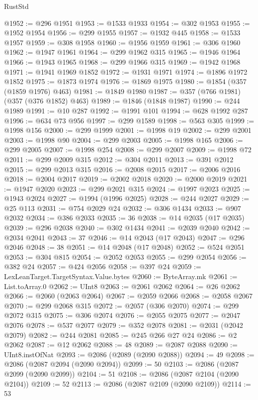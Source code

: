 \begin{lexlean}{RustStd}
\begin{coremodule}
@1952 := @296 @1951
@1953 := @1533 @1933
@1954 := @302 @1953
@1955 := @1952 @1954
@1956 := @299 @1955
@1957 := @1932 @445
@1958 := @1533 @1957
@1959 := @308 @1958
@1960 := @1956 @1959
@1961 := @306 @1960
@1962 := @1947 @1961
@1964 := @299 @1962 @315
@1965 := @1946 @1964
@1966 := @1943 @1965
@1968 := @299 @1966 @315
@1969 := @1942 @1968
@1971 := @1941 @1969 @1852
@1972 := @1931 @1971
@1974 := @1896 @1972 @1852
@1975 := @1873 @1974
@1976 := @1869 @1975
@1980 := @1854 (@357 (@1859 @1976) @463)
@1981 := @1849 @1980
@1987 := @357 (@766 @1981) (@357 (@376 @1852) @463)
@1989 := @1846 (@1848 @1987)
@1990 := @244 @1989
@1991 := @10 @287
@1992 := @1991 @101
@1994 := @628 @1992 @287
@1996 := @634 @73 @956
@1997 := @299 @1589
@1998 := @563 @305
@1999 := @1998 @156
@2000 := @299 @1999
@2001 := @1998 @19
@2002 := @299 @2001
@2003 := @1998 @90
@2004 := @299 @2003
@2005 := @1998 @165
@2006 := @299 @2005
@2007 := @1998 @254
@2008 := @299 @2007
@2009 := @1998 @72
@2011 := @299 @2009 @315
@2012 := @304 @2011
@2013 := @391 @2012
@2015 := @299 @2013 @315
@2016 := @2008 @2015
@2017 := @2006 @2016
@2018 := @2004 @2017
@2019 := @2002 @2018
@2020 := @2000 @2019
@2021 := @1947 @2020
@2023 := @299 @2021 @315
@2024 := @1997 @2023
@2025 := @1943 @2024
@2027 := @1994 (@1996 @2025)
@2028 := @244 @2027
@2029 := @25 @113
@2031 := @754 @2029 @24
@2032 := @306 @1434
@2033 := @907 @2032
@2034 := @386 @2033
@2035 := 36
@2038 := @14 @2035 (@17 @2035)
@2039 := @296 @2038
@2040 := @302 @1434
@2041 := @2039 @2040
@2042 := @2034 @2041
@2043 := 37
@2046 := @14 @2043 (@17 @2043)
@2047 := @296 @2046
@2048 := 38
@2051 := @14 @2048 (@17 @2048)
@2052 := @524 @2051
@2053 := @304 @815
@2054 := @2052 @2053
@2055 := @299 @2054
@2056 := @382 @24
@2057 := @424 @2056
@2058 := @397 @24
@2059 := LexLeanTarget.TargetSyntax.Value.bytes
@2060 := ByteArray.mk
@2061 := List.toArray.{0}
@2062 := UInt8
@2063 := @2061 @2062
@2064 := @26 @2062
@2066 := @2060 (@2063 @2064)
@2067 := @2059 @2066
@2068 := @2058 @2067
@2070 := @299 @2068 @315
@2072 := @2057 (@306 @2070)
@2074 := @299 @2072 @315
@2075 := @306 @2074
@2076 := @2055 @2075
@2077 := @2047 @2076
@2078 := @537 @2077
@2079 := @352 @2078
@2081 := @2031 (@2042 @2079)
@2082 := @244 @2081
@2085 := @245 @266 @27 @24
@2086 := @2 @2062
@2087 := @12 @2062
@2088 := 48
@2089 := @2087 @2088
@2090 := UInt8.instOfNat
@2093 := @2086 (@2089 (@2090 @2088))
@2094 := 49
@2098 := @2086 (@2087 @2094 (@2090 @2094))
@2099 := 50
@2103 := @2086 (@2087 @2099 (@2090 @2099))
@2104 := 51
@2108 := @2086 (@2087 @2104 (@2090 @2104))
@2109 := 52
@2113 := @2086 (@2087 @2109 (@2090 @2109))
@2114 := 53

\end{coremodule}
\end{lexlean}
